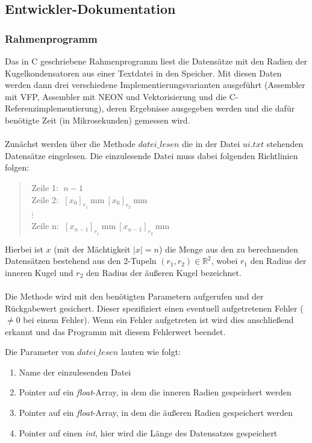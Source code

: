 \documentclass[11pt]{scrartcl}
\begin{document}
\subsection{Entwickler-Dokumentation}
\subsubsection{Rahmenprogramm}
Das in C geschriebene Rahmenprogramm liest die Datensätze mit den Radien der Kugelkondensatoren aus einer Textdatei in den Speicher.
Mit diesen Daten werden dann drei verschiedene Implementierungsvarianten ausgeführt (Assembler mit VFP, Assembler mit NEON und Vektorisierung und die C-Referenzimplementierung), deren Ergebnisse ausgegeben werden und die dafür benötigte Zeit (in Mikrosekunden) gemessen wird.
\\\\
Zunächst werden über die Methode \emph{$datei\_lesen$} die in der Datei \emph{$ui.txt$} stehenden Datensätze eingelesen. Die einzulesende Datei muss dabei folgenden Richtlinien folgen:
\begin{verse}
$ $ Zeile 1: $\; n-1 $ \\
$ $ Zeile 2: $\; [x_{0}]_{r_{1}} \: $mm$ \: [x_{0}]_{r_{2}} \: $mm$ $ \\
$ $ $\vdots $\\
$ $ Zeile n: $\; [x_{n-1}]_{r_{1}} \: $mm$ \: [x_{n-1}]_{r_{2}}\: $mm$ $
\end{verse}
Hierbei ist $x$ (mit der Mächtigkeit $\vert x \vert = n$) die Menge aus den zu berechnenden Datensätzen bestehend aus den 2-Tupeln $(r_{1},r_{2})\in \mathbb{R}^{2} $, wobei $r_{1}$ den Radius der inneren Kugel und $r_{2}$ den Radius der äußeren Kugel bezeichnet.
\\\\
Die Methode wird mit den benötigten Parametern aufgerufen und der Rückgabewert gesichert. Dieser spezifiziert einen eventuell aufgetretenen Fehler ($\neq 0$ bei einem Fehler). Wenn ein Fehler aufgetreten ist wird dies anschließend erkannt und das Programm mit diesem Fehlerwert beendet.

Die Parameter von \emph{$datei\_lesen$} lauten wie folgt:
\begin{enumerate}
\item Name der einzulesenden Datei
\item Pointer auf ein \emph{float}-Array, in dem die inneren Radien gespeichert werden
\item Pointer auf ein \emph{float}-Array, in dem die äußeren Radien gespeichert werden
\item Pointer auf einen \emph{int}, hier wird die Länge des Datensatzes gespeichert
\end{enumerate}
\end{document}
